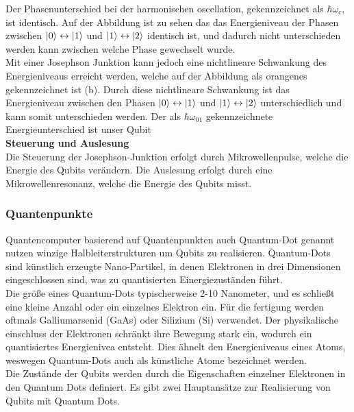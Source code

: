 Der Phasenunterschied bei der harmonischen oscellation, gekennzeichnet als $\hbar\omega_c$, ist identisch. Auf der Abbildung ist zu sehen das das Energieniveau der Phasen zwischen $\ket{0} \leftrightarrow \ket{1}$
und $\ket{1} \leftrightarrow \ket{2}$ identisch ist, und dadurch nicht unterschieden werden kann zwischen welche Phase gewechselt wurde.\\

Mit einer Josephson Junktion kann jedoch eine nichtlineare Schwankung des Energieniveaus erreicht werden, welche auf der Abbildung als orangenes  gekennzeichnet ist (b).
Durch diese nichtlineare Schwankung ist das Energieniveau zwischen den Phasen $\ket{0} \leftrightarrow \ket{1}$ und $\ket{1} \leftrightarrow \ket{2}$ unterschiedlich und kann somit unterschieden werden.
Der als $\hbar\omega_{01}$ gekennzeichnete Energieunterschied ist unser Qubit\\

\textbf{Steuerung und Auslesung}\\
Die Steuerung der Josephson-Junktion erfolgt durch Mikrowellenpulse, welche die Energie des Qubits verändern. Die Auslesung erfolgt durch eine Mikrowellenresonanz, welche die Energie des Qubits misst.\\

\subsubsection{Quantenpunkte}
\label{subsub:quantenpunkte}
Quantencomputer basierend auf Quantenpunkten auch Quantum-Dot genannt nutzen winzige Halbleiterstrukturen um Qubits zu realisieren.
Quantum-Dots sind künstlich erzeugte Nano-Partikel, in denen Elektronen in drei Dimensionen eingeschlossen sind, was zu quantisierten Einergiezuständen führt.\\

Die größe eines Quantum-Dots typischerweise 2-10 Nanometer, und es schließt eine kleine Anzahl oder ein einzelnes Elektron ein.
Für die fertigung werden oftmals Galliumarsenid (GaAs) oder Silizium (Si) verwendet. Der physikalische einschluss der Elektronen schränkt ihre
Bewegung stark ein, wodurch ein quantisiertes Energienivea entsteht. Dies ähnelt den Energieniveaus eines Atoms, weswegen Quantum-Dots auch als künstliche Atome bezeichnet werden.\\

Die Zustände der Qubits werden durch die Eigenschaften einzelner Elektronen in den Quantum Dots definiert. Es gibt zwei Hauptansätze zur Realisierung von Qubits mit Quantum Dots.\\

